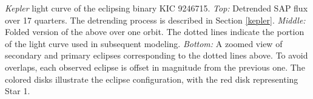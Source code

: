 \label{fig:keplerfig} \emph{Kepler} light curve of the eclipsing binary KIC 9246715. \emph{Top:} Detrended SAP flux over 17 quarters. The detrending process is described in Section \ref{kepler}. \emph{Middle:} Folded version of the above over one orbit. The dotted lines indicate the portion of the light curve used in subsequent modeling. \emph{Bottom:} A zoomed view of secondary and primary eclipses corresponding to the dotted lines above. To avoid overlaps, each observed eclipse is offset in magnitude from the previous one. The colored disks illustrate the eclipse configuration, with the red disk representing Star 1.

  